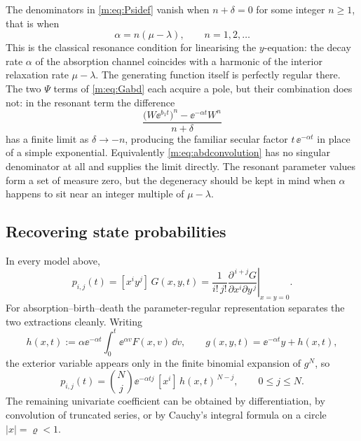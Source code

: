 \begin{remark}[Resonance]
\label{m:rem:resonance}
The denominators in \cref{m:eq:Psidef} vanish when $n+\delta=0$ for some integer
$n\ge1$, that is when
\begin{equation}
\label{m:eq:resonance}
\alpha = n(\mu-\lambda),\qquad n=1,2,\dots
\end{equation}
This is the classical resonance condition for linearising the $y$-equation: the
decay rate $\alpha$ of the absorption channel coincides with a harmonic of the
interior relaxation rate $\mu-\lambda$. The generating function itself is perfectly
regular there. The two $\Psi$ terms of \cref{m:eq:Gabd} each acquire a pole, but
their combination does not: in the resonant term the difference
\begin{equation*}
\frac{\bigl(W\ee^{b_1t}\bigr)^{n} - \ee^{-\alpha t}W^{n}}{n+\delta}
\end{equation*}
has a finite limit as $\delta\to-n$, producing the familiar secular factor
$t\,\ee^{-\alpha t}$ in place of a simple exponential. Equivalently
\cref{m:eq:abdconvolution} has no singular denominator at all and supplies the
limit directly. The resonant parameter values form a set of measure zero, but the
degeneracy should be kept in mind when $\alpha$ happens to sit near an integer
multiple of $\mu-\lambda$.
\end{remark}

\subsection{Recovering state probabilities}
\label{m:app:coefrecovery}

In every model above,
\begin{equation}
\label{m:eq:bivariatecoef}
p_{i,j}(t) = [x^iy^j]\,G(x,y,t)
= \frac{1}{i!\,j!}\left.\frac{\partial^{\,i+j}G}{\partial x^i\partial y^{\,j}}
\right|_{x=y=0} .
\end{equation}
For absorption--birth--death the parameter-regular representation separates the two
extractions cleanly. Writing
\begin{equation}
\label{m:eq:hdef}
h(x,t) := \alpha\ee^{-\alpha t}\int_0^t\ee^{\alpha v}F(x,v)\,\dd v,
\qquad
g(x,y,t) = \ee^{-\alpha t}y + h(x,t),
\end{equation}
the exterior variable appears only in the finite binomial expansion of $g^N$, so
\begin{equation}
\label{m:eq:abdcoef}
p_{i,j}(t) = \binom{N}{j}\ee^{-\alpha tj}\,[x^i]\,h(x,t)^{\,N-j},
\qquad 0\le j\le N .
\end{equation}
The remaining univariate coefficient can be obtained by differentiation, by
convolution of truncated series, or by Cauchy's integral formula on a circle
$|x|=\varrho<1$.

\FloatBarrier
